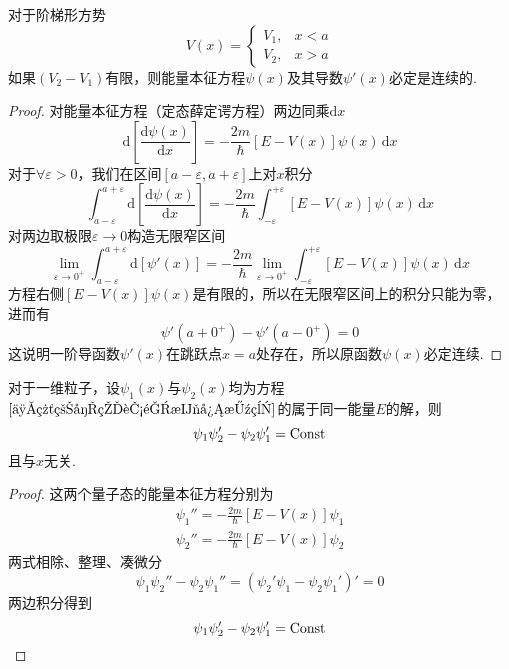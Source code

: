 \begin{theorem}\label{定理5}
    对于阶梯形方势
    $$
        V(x) = \begin{cases}
            V_1, & x<a \\
            V_2, & x>a
        \end{cases}
    $$
    如果$(V_2-V_1)$有限，则能量本征方程$\psi(x)$及其导数$\psi'(x)$必定是连续的.
\end{theorem}
\begin{proof}
    对能量本征方程（定态薛定谔方程）两边同乘$\mathrm{d}x$
    $$
        \mathrm{d}\left[\frac{\mathrm{d}\psi(x)}{\mathrm{d}x}\right]
        =-\frac{2m}{\hbar}[E-V(x)]\psi(x)\,\mathrm{d}x
    $$
    对于$\forall\varepsilon>0$，我们在区间$[a-\varepsilon, a+\varepsilon]$上对$x$积分
    $$
        \int_{a-\varepsilon}^{a+\varepsilon}\mathrm{d}\left[\frac{\mathrm{d}\psi(x)}{\mathrm{d}x}\right]
        =-\frac{2m}{\hbar}\int_{-\varepsilon}^{+\varepsilon}[E-V(x)]\psi(x)\,\mathrm{d}x
    $$
    对两边取极限$\varepsilon \to 0$构造无限窄区间
    $$
        \lim_{\varepsilon\to0^+}\int_{a-\varepsilon}^{a+\varepsilon}\mathrm{d}\left[\psi'(x)\right]
        =-\frac{2m}{\hbar}\lim_{\varepsilon\to0^+}\int_{-\varepsilon}^{+\varepsilon}[E-V(x)]\psi(x)\,\mathrm{d}x
    $$
    方程右侧$[E-V(x)]\psi(x)$是有限的，所以在无限窄区间上的积分只能为零，进而有
    $$
        \psi'(a+0^+)-\psi'(a-0^+)=0
    $$
    这说明一阶导函数$\psi'(x)$在跳跃点$x=a$处存在，所以原函数$\psi(x)$必定连续.
\end{proof}





\begin{theorem}\label{定理6}
    对于一维粒子，设$\psi_1(x)$与$\psi_2(x)$均为方程$\eqref{一维粒子的能量本征方程}$的属于同一能量$E$的解，则
    $$
        \psi_1\psi_2' - \psi_2\psi_1' = {\rm Const}
    $$
    且与$x$无关.
\end{theorem}
\begin{proof}
    这两个量子态的能量本征方程分别为
    $$
        \begin{aligned}
            \psi_1''=-\frac{2m}{\hbar}[E-V(x)]\psi_1 \\
            \psi_2''=-\frac{2m}{\hbar}[E-V(x)]\psi_2
        \end{aligned}
    $$
    两式相除、整理、凑微分
    $$
        \psi_1\psi_2''-\psi_2\psi_1''=(\psi_2'\psi_1-\psi_2\psi_1')'=0
    $$
    两边积分得到
    $$
        \psi_1\psi_2' - \psi_2\psi_1' = {\rm Const}
    $$
\end{proof}






